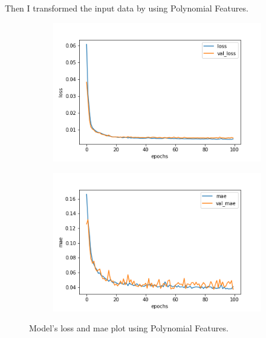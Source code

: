 \documentclass[12pt]{article}
\begin{document}
\pagebreak
Then I transformed the input data by using Polynomial Features. 
\begin{figure}[H]
\centering
\begin{subfigure}{0.5\linewidth}
\includegraphics[width=\textwidth]{loss_poly.png}
\end{subfigure}
\begin{subfigure}{0.5\linewidth}
\includegraphics[width=\textwidth]{mae_poly.png}
\end{subfigure}
\label{mesh:fig1}
\caption{Model's loss and mae plot using Polynomial Features.}
\end{figure}
\end{document}
